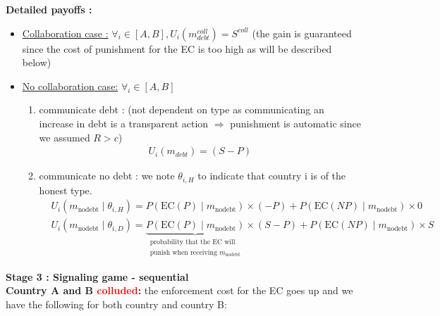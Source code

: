 \documentclass{article}
\begin{document}
\textbf{Detailed payoffs :}
\begin{itemize}
    \item \underline{Collaboration case :} $\forall_i\in[A,B], U_i(m_{debt}^{coll})=S^{coll}$ (the gain is guaranteed since the cost of punishment for the EC is too high as will be described below)
    \item \underline{No collaboration case:} $\forall_i\in[A,B]$
    \begin{enumerate}
        \item communicate debt : (not dependent on type as communicating an increase in debt is a transparent action $\Rightarrow$ punishment is automatic since we assumed $R>c$) 
        \begin{equation}
        \begin{aligned}
            U_i(m_{debt})=(S-P)
        \end{aligned}
        \end{equation}
        \item communicate no debt : we note $\theta_{i,H}$ to indicate that country i is of the honest type. 
        \begin{equation}  
        \begin{aligned}  
            &U_i(m_{\text{nodebt}} \mid \theta_{i,H}) = P(\text{EC}(P) \mid m_{\text{nodebt}})\times(- P) + P(\text{EC}(NP) \mid m_{\text{nodebt}}) \times 0   \\  
            &U_i(m_{\text{nodebt}} \mid \theta_{i,D}) =   
                \underbrace{P(\text{EC}(P) \mid m_{\text{nodebt}})}_{  
                    \substack{  
                        \text{probability that the EC will} \\  
                        \text{punish when receiving } m_{\text{nodebt}}  
                    }  
                }\times(S - P) + P(\text{EC}(NP) \mid m_{\text{nodebt}}) \times S  
        \end{aligned}  
        \end{equation}  
    \end{enumerate}
\end{itemize}

\noindent\textbf{Stage 3 : Signaling game - sequential}\\
\textbf{Country A and B \textcolor{red}{colluded}:} the enforcement cost for the EC goes up and we have the following for both country and country B: 
\end{document}
